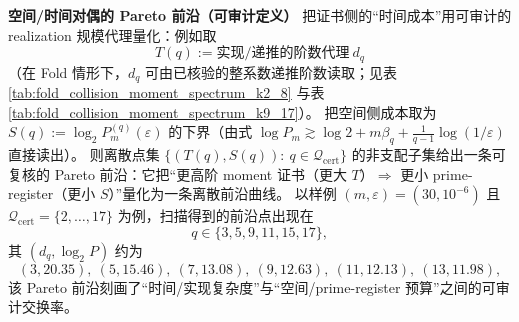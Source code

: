 \begin{remark}
\medskip\noindent\textbf{空间/时间对偶的 Pareto 前沿（可审计定义）}
把证书侧的“时间成本”用可审计的 realization 规模代理量化：例如取
\[
T(q):=\text{实现/递推的阶数代理}\ d_q
\]
（在 Fold 情形下，\(d_q\) 可由已核验的整系数递推阶数读取；见表 \ref{tab:fold_collision_moment_spectrum_k2_8} 与表 \ref{tab:fold_collision_moment_spectrum_k9_17}）。
把空间侧成本取为
\(
S(q):=\log_2 P_m^{(q)}(\varepsilon)
\)
的下界（由式 \(\log P_m\gtrsim \log2+m\beta_q+\frac{1}{q-1}\log(1/\varepsilon)\) 直接读出）。
则离散点集
\(
\{(T(q),S(q)):\ q\in\mathcal{Q}_{\mathrm{cert}}\}
\)
的非支配子集给出一条可复核的 Pareto 前沿：它把“更高阶 moment 证书（更大 \(T\)）\(\Rightarrow\) 更小 prime-register（更小 \(S\)）”量化为一条离散前沿曲线。
以样例 \((m,\varepsilon)=(30,10^{-6})\) 且 \(\mathcal{Q}_{\mathrm{cert}}=\{2,\dots,17\}\) 为例，扫描得到的前沿点出现在
\[
q\in\{3,5,9,11,15,17\},
\]
其 \((d_q,\log_2 P)\) 约为
\[
(3,20.35),\ (5,15.46),\ (7,13.08),\ (9,12.63),\ (11,12.13),\ (13,11.98),
\]
该 Pareto 前沿刻画了“时间/实现复杂度”与“空间/prime-register 预算”之间的可审计交换率。
\end{remark}

